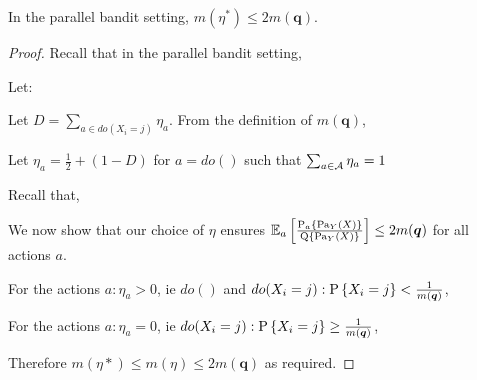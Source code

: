 \begin{proposition} In the parallel bandit setting,
$m(\eta^*) \leq 2m(\boldsymbol{q})$.
\end{proposition} 

\begin{proof}

Recall that in the parallel bandit setting,


Let:


Let $D =\sum_{a\in do(X_i=j)}\eta_a$. From the definition of $m(\boldsymbol{q})$, 
 
Let $\eta_a = \frac{1}{2} + (1-D)$ for $a = do()$ such that $\sum_{a \in \calA}\eta_a = 1$ 

Recall that,


We now show that our choice of $\eta$ ensures $\EEa\left[\frac{\Pn{a}{\parents{Y}(X)}}{\Q{\parents{Y}(X)}}\right] \leq 2m(\boldsymbol{q})$ for all actions $a$.

For the actions $a: \eta_a > 0$, ie $do()$ and $do(X_i = j):\P{X_i=j}<\frac{1}{m(\boldsymbol{q})}$,

For the actions $a :\eta_a = 0$, ie $do(X_i=j):\P{X_i=j}\geq\frac{1}{m(\boldsymbol{q})}$,

Therefore $m(\eta*) \leq m(\eta) \leq 2m(\boldsymbol{q})$ as required.

\end{proof}
\


